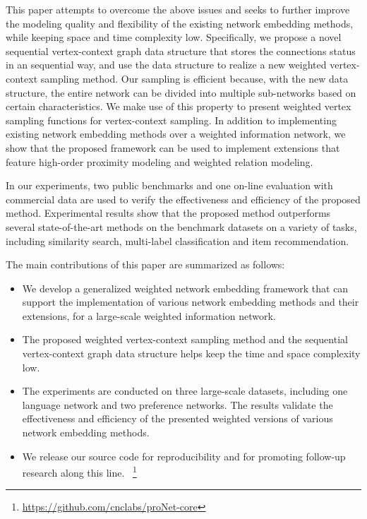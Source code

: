 This paper attempts to overcome the above issues and seeks to further improve the modeling quality and flexibility of the existing network embedding methods, while keeping space and time complexity low.  Specifically, we propose a novel sequential vertex-context graph data structure that stores the connections status in an sequential way, and use the data structure to realize a new weighted vertex-context sampling method.
Our sampling is efficient because, with the new data structure, the entire network can be divided into multiple sub-networks based on certain characteristics.  We make use of this property to present weighted vertex sampling functions for vertex-context sampling.
In addition to implementing existing network embedding methods over a weighted information network, we show that the proposed framework can be used to implement extensions that feature high-order proximity modeling and weighted relation modeling.


In our experiments, two public benchmarks and one on-line evaluation with commercial data are used to verify the effectiveness and efficiency of the proposed method. Experimental results show that the proposed method outperforms several state-of-the-art methods on the benchmark datasets on a variety of tasks, including similarity search, multi-label classification and item recommendation.  

The main contributions of this paper are summarized as follows:
\begin{itemize}
  \item We develop a generalized weighted network embedding framework that can support the implementation of various network embedding methods and their extensions, for a large-scale weighted information network. %
  \item The proposed weighted vertex-context sampling method and the sequential vertex-context  graph data structure helps keep the time and space complexity low.
  \item The experiments are conducted on three large-scale datasets, including one language network and two preference networks.  The results validate the effectiveness and efficiency of the presented weighted versions of various network embedding methods.
  \item We release our source code for reproducibility and for promoting follow-up research along this line.
  ~\footnote{\href{https://github.com/cnclabs/proNet-core}{https://github.com/cnclabs/proNet-core}}
\end{itemize}


